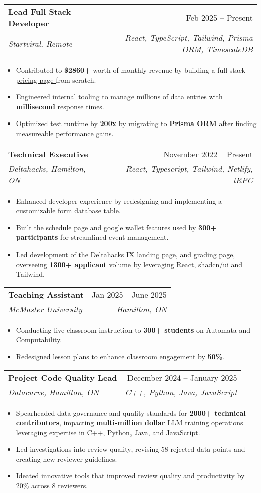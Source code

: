 \documentclass[letterpaper,11pt]{article}
\makeatletter
\newcommand{\resumeItem}[1]{
  \item\small{
    {#1 \vspace{-2pt}}
  }
}
\newcommand{\resumeSubheading}[4]{
  \vspace{-2pt}\item
    \begin{tabular*}{0.97\textwidth}[t]{l@{\extracolsep{\fill}}r}
      \textbf{#1} & #2 \\
      \textit{\small#3} & \textit{\small #4} \\
    \end{tabular*}\vspace{-7pt}
}
\newcommand{\resumeItemListStart}{\begin{itemize}}
\newcommand{\resumeItemListEnd}{\end{itemize}\vspace{-5pt}}
\makeatother
\begin{document}
\resumeSubheading
{Lead Full Stack Developer}{Feb 2025 -- Present}
{Startviral, Remote}{React, TypeScript, Tailwind, Prisma ORM, TimescaleDB}
\resumeItemListStart
\resumeItem{Contributed to \textbf{\$2860+} worth of monthly revenue by building a full stack \href{https://pricing.startviral.de}{\underline{pricing page \faIcon{external-link-alt}}} from scratch.}
\resumeItem{Engineered internal tooling to manage millions of data entries with \textbf{millisecond} response times.}
\resumeItem{Optimized test runtime by \textbf{200x} by migrating to \textbf{Prisma ORM} after finding measureable performance gains.}
\resumeItemListEnd

\resumeSubheading
{Technical Executive}{November 2022 -- Present}
{Deltahacks, Hamilton, ON}{React, Typescript, Tailwind, Netlify, tRPC}
\resumeItemListStart
\resumeItem{Enhanced developer experience by redesigning and implementing a customizable form database table.}
\resumeItem{Built the schedule page and google wallet features used by \textbf{300+ participants} for streamlined event management.}
\resumeItem{Led development of the Deltahacks IX landing page, and grading page, overseeing \textbf{1300+ applicant} volume by leveraging React, shadcn/ui and Tailwind.}
\resumeItemListEnd

\resumeSubheading
{Teaching Assistant}{Jan 2025 - June 2025}
{McMaster University}{Hamilton, ON}
\resumeItemListStart
\resumeItem{Conducting live classroom instruction to \textbf{300+ students} on Automata and Computability.}
\resumeItem{Redesigned lesson plans to enhance classroom engagement by \textbf{50\%}.}
\resumeItemListEnd

\resumeSubheading
{Project Code Quality Lead}{December 2024 -- January 2025}
{Datacurve, Hamilton, ON}{C++, Python, Java, JavaScript}
\resumeItemListStart
\resumeItem{Spearheaded data governance and quality standards for \textbf{2000+ technical contributors}, impacting \textbf{multi-million dollar} LLM training operations leveraging expertise in C++, Python, Java, and JavaScript.}
\resumeItem{Led investigations into review quality, revising 58 rejected data points and creating new reviewer guidelines.}
\resumeItem{Ideated innovative tools that improved review quality and productivity by 20\% across 8 reviewers.}
\resumeItemListEnd

\end{document}
